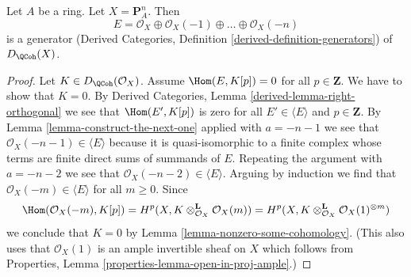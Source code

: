 \begin{lemma}
\label{lemma-generator-P1}
Let $A$ be a ring. Let $X = \mathbf{P}^n_A$. Then
$$
E =
\mathcal{O}_X \oplus \mathcal{O}_X(-1) \oplus \ldots \oplus \mathcal{O}_X(-n)
$$
is a generator
(Derived Categories, Definition \ref{derived-definition-generators})
of $D_\QCoh(X)$.
\end{lemma}

\begin{proof}
Let $K \in D_\QCoh(\mathcal{O}_X)$. Assume
$\Hom(E, K[p]) = 0$ for all $p \in \mathbf{Z}$.
We have to show that $K = 0$.
By Derived Categories, Lemma
\ref{derived-lemma-right-orthogonal}
we see that $\Hom(E', K[p])$ is zero for all $E' \in \langle E \rangle$
and $p \in \mathbf{Z}$.
By Lemma \ref{lemma-construct-the-next-one}
applied with $a = -n - 1$
we see that $\mathcal{O}_X(-n - 1) \in \langle E \rangle$
because it is quasi-isomorphic to a finite complex
whose terms are finite direct sums of summands of $E$.
Repeating the argument with $a = -n - 2$ we see that
$\mathcal{O}_X(-n - 2) \in \langle E \rangle$.
Arguing by induction we find that $\mathcal{O}_X(-m) \in \langle E \rangle$
for all $m \geq 0$.
Since
$$
\Hom(\mathcal{O}_X(-m), K[p]) =
H^p(X, K \otimes_{\mathcal{O}_X}^\mathbf{L} \mathcal{O}_X(m)) =
H^p(X, K \otimes_{\mathcal{O}_X}^\mathbf{L} \mathcal{O}_X(1)^{\otimes m})
$$
we conclude that $K = 0$ by Lemma \ref{lemma-nonzero-some-cohomology}.
(This also uses that $\mathcal{O}_X(1)$ is an ample
invertible sheaf on $X$ which follows from
Properties, Lemma \ref{properties-lemma-open-in-proj-ample}.)
\end{proof}